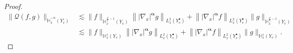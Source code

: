 \documentclass[AHL,Unicode,longabstracts,published]{cedram}
\newcommand{\bbH}{\mathbb{H}}
\newcommand{\QQ}{\mathcal{Q}}
\newcommand{\Sg}{Y}
\newcommand{\Sgp}{Y^{\bullet}}
\newcommand{\Sgm}{Y^{\circ}}
\begin{document}
\begin{proof}
\begin{equation*}
\begin{split}
\| \QQ(f, g) \|_{\dot{\bbH}^{-\alpha}_x \left(\Sgm_v \right) } &\lesssim \| f \|_{ \dot{\bbH}_x^{\frac{d}{2} - 1} \left(\Sg_v \right) } \left\| | \nabla_{x} |^{\boldsymbol{\alpha}} g \right\|_{ L^2_x \left(\Sgp_v \right) } + \left\| | \nabla_x |^{\boldsymbol{\alpha}} f \right\|_{ L^2_x\left(\Sgp_v \right) } \| g \|_{ \dot{\bbH}^{\frac{d}{2} - 1}_x \left(\Sg_v \right) } \\
&\lesssim \| f \|_{ \bbH^s_x \left(\Sg_v \right) } \left\| | \nabla_{x} |^{\boldsymbol{\alpha}} g \right\|_{ L^2_x \left(\Sgp_v \right) } + \left\| | \nabla_{x} |^{\boldsymbol{\alpha}} f \right\|_{ L^2_x \left(\Sgp_v \right) } \| g \|_{ \bbH^s_x \left(\Sg_v \right) }.
\end{split}
\end{equation*}


\end{proof}
\end{document}

